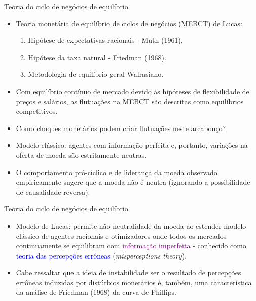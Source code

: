 \documentclass[10pt]{beamer}
\begin{document}
\begin{frame}{Teoria do ciclo de negócios de equilíbrio}
    \begin{itemize}
        \item Teoria monetária de equilíbrio de ciclos de negócios (MEBCT) de Lucas:
        \bigskip
        \begin{enumerate}
            \item Hipótese de expectativas racionais - Muth (1961).
            \bigskip
            \item Hipótese da taxa natural - Friedman (1968).
            \bigskip
            \item Metodologia de equilíbrio geral Walrasiano.
        \end{enumerate}
        \bigskip
        \item Com equilíbrio contínuo de mercado devido às hipóteses de flexibilidade de preços e salários, as flutuações na MEBCT são descritas como equilíbrios competitivos.
        \bigskip
        \item Como choques monetários podem criar flutuações neste arcabouço?
        \bigskip
        \item Modelo clássico: agentes com informação perfeita e, portanto, variações na oferta de moeda são estritamente neutras.
        \bigskip
        \item O comportamento pró-cíclico e de liderança da moeda observado empiricamente sugere que a moeda não é neutra (ignorando a possibilidade de causalidade reversa).
    \end{itemize}
\end{frame}

\begin{frame}{Teoria do ciclo de negócios de equilíbrio}
    \begin{itemize}
        \item Modelo de Lucas: permite não-neutralidade da moeda ao estender modelo clássico de agentes racionais e otimizadores onde todos os mercados continuamente se equilibram com \textcolor{purple}{informação imperfeita} - conhecido como \textcolor{blue}{teoria das percepções errôneas} (\emph{misperceptions theory}).
        \bigskip
        \item Cabe ressaltar que a ideia de instabilidade ser o resultado de percepções errôneas induzidas por distúrbios monetários é, também, uma característica da análise de Friedman (1968) da curva de Phillips.
    \end{itemize}
\end{frame}
\end{document}
